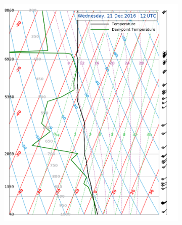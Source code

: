 \begin{landscape}
\begin{figure}
\begin{subfigure}[b]{0.66\textheight}
			\includegraphics[trim={0cm 0.2cm 2.5cm .5cm},clip,width=\textwidth]{./fig_Sounding/20161221_12Z}
			\caption{}\label{fig:Soun21}
		\end{subfigure}
	\end{figure}
	

\end{landscape}

